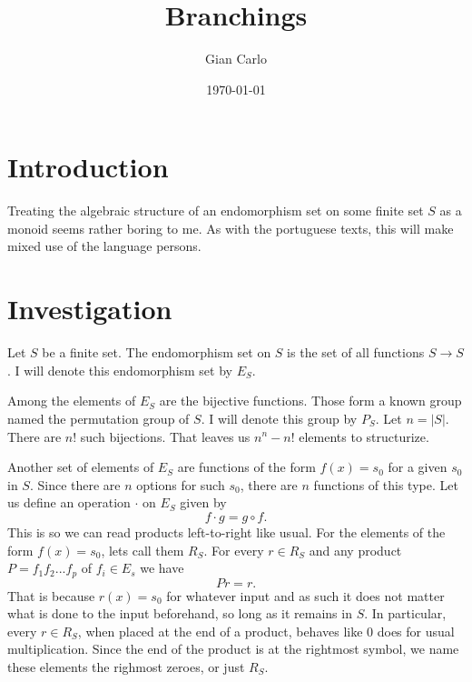 \documentclass[11pt]{article}
\title{Branchings}
\author{Gian Carlo}
\date{\today}
\theoremstyle{plain}
\theoremstyle{nonumberplain}
\begin{document}
\maketitle

\newcommand{\ot}{\leftarrow}
\newcommand{\inv}[1]{#1^{-1}}

\section{Introduction}

Treating the algebraic structure of an endomorphism set on some finite set $S$ as a monoid seems rather boring to me. As with the portuguese texts, this will make mixed use of the language persons.

\section{Investigation}

Let $S$ be a finite set. The endomorphism set on $S$ is the set of all functions $S \to S$. I will denote this endomorphism set by $E_S$. 

Among the elements of $E_S$ are the bijective functions. Those form a known group named the permutation group of $S$. I will denote this group by $P_S$. Let $n = |S|$. There are $n!$ such bijections. That leaves us $n^n - n!$ elements to structurize.

Another set of elements of $E_S$ are functions of the form $f(x) = s_0$ for a given $s_0$ in $S$. Since there are $n$ options for such $s_0$, there are $n$ functions of this type. Let us define an operation $\cdot$ on $E_S$ given by \begin{equation}
    f \cdot g = g \circ f.
\end{equation}
This is so we can read products left-to-right like usual. For the elements of the form $f(x) = s_0$, lets call them $R_S$. For every $r \in R_S$ and any product $P = f_1f_2...f_p$ of $f_i \in E_s$ we have \begin{equation}
    Pr = r.
\end{equation}
That is because $r(x) = s_0$ for whatever input and as such it does not matter what is done to the input beforehand, so long as it remains in $S$. In particular, every $r \in R_S$, when placed at the end of a product, behaves like $0$ does for usual multiplication. Since the end of the product is at the rightmost symbol, we name these elements the righmost zeroes, or just $R_S$.
\end{document}
